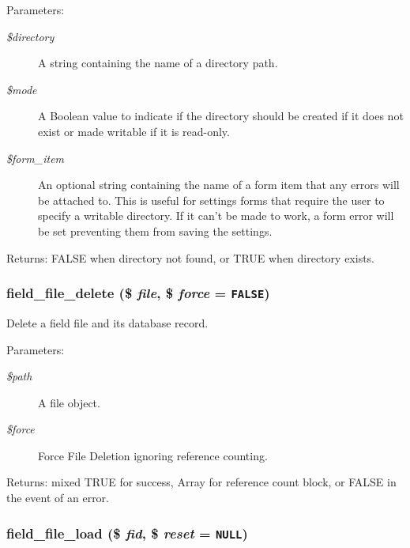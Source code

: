 \begin{Desc}
\item[Parameters:]
\begin{description}
\item[{\em \$directory}]A string containing the name of a directory path. \item[{\em \$mode}]A Boolean value to indicate if the directory should be created if it does not exist or made writable if it is read-only. \item[{\em \$form\_\-item}]An optional string containing the name of a form item that any errors will be attached to. This is useful for settings forms that require the user to specify a writable directory. If it can't be made to work, a form error will be set preventing them from saving the settings. \end{description}
\end{Desc}
\begin{Desc}
\item[Returns:]FALSE when directory not found, or TRUE when directory exists. \end{Desc}
\hypertarget{field__file_8inc_74e2e4f228eddabf95dc2c8e1b0ebfb4}{
\subsubsection[{field\_\-file\_\-delete}]{\setlength{\rightskip}{0pt plus 5cm}field\_\-file\_\-delete (\$ {\em file}, \/  \$ {\em force} = {\tt FALSE})}}
\label{field__file_8inc_74e2e4f228eddabf95dc2c8e1b0ebfb4}


Delete a field file and its database record.

\begin{Desc}
\item[Parameters:]
\begin{description}
\item[{\em \$path}]A file object. \item[{\em \$force}]Force File Deletion ignoring reference counting. \end{description}
\end{Desc}
\begin{Desc}
\item[Returns:]mixed TRUE for success, Array for reference count block, or FALSE in the event of an error. \end{Desc}
\hypertarget{field__file_8inc_a56eff88e875747bcaacd268163badd9}{
\subsubsection[{field\_\-file\_\-load}]{\setlength{\rightskip}{0pt plus 5cm}field\_\-file\_\-load (\$ {\em fid}, \/  \$ {\em reset} = {\tt NULL})}}
\label{field__file_8inc_a56eff88e875747bcaacd268163badd9}


